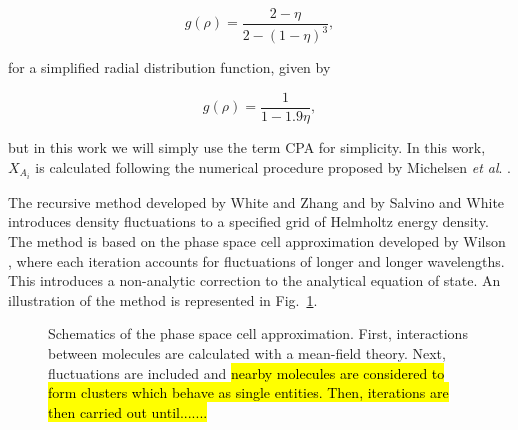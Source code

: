 \documentclass[preprint,12pt,3p]{elsarticle}
\begin{document}
\begin{equation} \label{eq:g(r)}
g(\rho) = \frac{2-\eta}{2-\left(1-\eta\right)^{3}} ,
\end{equation}

for a simplified radial distribution function, given by

\begin{equation} \label{eq:gs(r)}
g(\rho) = \frac{1}{1-1.9\eta} ,
\end{equation}


but in this work we will simply use the term CPA for simplicity.
In this work, $X_{A_{i}}$ is calculated following the numerical procedure proposed by Michelsen \textit{et al}.
 \citep{michelsen2006robust}.

The recursive method developed by White and Zhang \cite{white1993renormalization, white1995renormalization, white1998renormalization} and by Salvino and White \citep{salvino1992calculation} introduces density fluctuations to a specified grid of Helmholtz energy density.
The method is based on the phase space cell approximation developed by Wilson \cite{wilson1971renormalization, wilson1971brenormalization}, where each iteration accounts for fluctuations of longer and longer wavelengths.
This introduces a non-analytic correction to the analytical equation of state.
An illustration of the method is represented in Fig.~\ref{fig:schematics}.

\begin{figure}[h!]
\centering
\captionsetup{justification=centering}
\caption{Schematics of the phase space cell approximation. First, interactions between molecules are calculated with a mean-field theory. Next, fluctuations are included and \hl{nearby molecules are considered to form clusters which behave as single entities. Then, iterations are then carried out until.......}}
\label{fig:schematics}
\end{figure}
\end{document}
